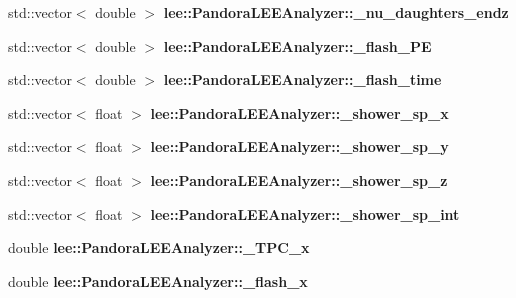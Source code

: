 \begin{DoxyCompactItemize}
\item 
\hypertarget{group__lee_ga0c2eb616df5aa07c601d0bc72399c636}{std\-::vector$<$ double $>$ {\bfseries lee\-::\-Pandora\-L\-E\-E\-Analyzer\-::\-\_\-nu\-\_\-daughters\-\_\-endz}}\label{group__lee_ga0c2eb616df5aa07c601d0bc72399c636}

\item 
\hypertarget{group__lee_ga9320e2f0e9a7e201a978a21a2eb74a39}{std\-::vector$<$ double $>$ {\bfseries lee\-::\-Pandora\-L\-E\-E\-Analyzer\-::\-\_\-flash\-\_\-\-P\-E}}\label{group__lee_ga9320e2f0e9a7e201a978a21a2eb74a39}

\item 
\hypertarget{group__lee_gaecdf711df932ed4823d2c9b222a3e8f4}{std\-::vector$<$ double $>$ {\bfseries lee\-::\-Pandora\-L\-E\-E\-Analyzer\-::\-\_\-flash\-\_\-time}}\label{group__lee_gaecdf711df932ed4823d2c9b222a3e8f4}

\item 
\hypertarget{group__lee_ga9792d3b416a42f2f2a9323318fe3288e}{std\-::vector$<$ float $>$ {\bfseries lee\-::\-Pandora\-L\-E\-E\-Analyzer\-::\-\_\-shower\-\_\-sp\-\_\-x}}\label{group__lee_ga9792d3b416a42f2f2a9323318fe3288e}

\item 
\hypertarget{group__lee_ga9e5b48ceffc6507a180a4c4bd9c0e6f3}{std\-::vector$<$ float $>$ {\bfseries lee\-::\-Pandora\-L\-E\-E\-Analyzer\-::\-\_\-shower\-\_\-sp\-\_\-y}}\label{group__lee_ga9e5b48ceffc6507a180a4c4bd9c0e6f3}

\item 
\hypertarget{group__lee_gad646e6376b43c3ed568725ae55e6b788}{std\-::vector$<$ float $>$ {\bfseries lee\-::\-Pandora\-L\-E\-E\-Analyzer\-::\-\_\-shower\-\_\-sp\-\_\-z}}\label{group__lee_gad646e6376b43c3ed568725ae55e6b788}

\item 
\hypertarget{group__lee_ga84b0714b78e775a1ed838971a1f71a49}{std\-::vector$<$ float $>$ {\bfseries lee\-::\-Pandora\-L\-E\-E\-Analyzer\-::\-\_\-shower\-\_\-sp\-\_\-int}}\label{group__lee_ga84b0714b78e775a1ed838971a1f71a49}

\item 
\hypertarget{group__lee_ga8c55bb8de6e184c1adbc191f3d6f12d5}{double {\bfseries lee\-::\-Pandora\-L\-E\-E\-Analyzer\-::\-\_\-\-T\-P\-C\-\_\-x}}\label{group__lee_ga8c55bb8de6e184c1adbc191f3d6f12d5}

\item 
\hypertarget{group__lee_ga5d01876afb52464a4e5f508f58f1f2cc}{double {\bfseries lee\-::\-Pandora\-L\-E\-E\-Analyzer\-::\-\_\-flash\-\_\-x}}\label{group__lee_ga5d01876afb52464a4e5f508f58f1f2cc}


\end{DoxyCompactItemize}

